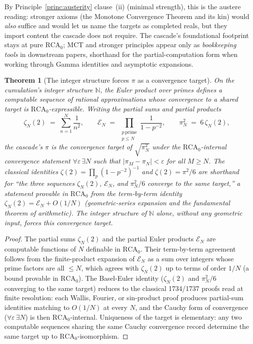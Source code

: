 \documentclass[11pt,a4paper]{article}
\newtheorem{theorem}{Theorem}[section]
\begin{document}
By Principle~\ref{princ:austerity} clause~(ii) (minimal strength),
this is the austere reading: stronger axioms (the Monotone
Convergence Theorem and its kin) would \emph{also} suffice and would
let us name the targets as completed reals, but they import content
the cascade does not require. The cascade's foundational footprint
stays at pure $\mathrm{RCA}_0$; $\mathrm{MCT}$ and stronger
principles appear only as \emph{bookkeeping tools} in downstream
papers, shorthand for the partial-computation form when working
through Gamma identities and asymptotic expansions.

\begin{theorem}[The integer structure forces $\pi$ as a convergence target]\label{thm:pi-from-primes}
On the cumulation's integer structure $\mathbb{N}$, the Euler product
over primes defines a computable sequence of rational approximations
whose convergence to a shared target is $\mathrm{RCA}_0$-expressible.
Writing the partial sums and partial products
\[
\zeta_N(2) \;=\; \sum_{n=1}^{N} \frac{1}{n^2},
\qquad
\mathcal{E}_N \;=\; \prod_{\substack{p\,\mathrm{prime}\\p\leq N}}
\frac{1}{1 - p^{-2}},
\qquad
\pi_N^2 \;=\; 6\,\zeta_N(2),
\]
the cascade's $\pi$ is the convergence target of $\sqrt{\pi_N^2}$
under the $\mathrm{RCA}_0$-internal convergence statement
$\forall\varepsilon\,\exists N$ such that $|\pi_M - \pi_N|<\varepsilon$
for all $M\geq N$. The classical identities
$\zeta(2) = \prod_p (1 - p^{-2})^{-1}$ and $\zeta(2)=\pi^2/6$ are
shorthand for ``the three sequences $\zeta_N(2)$, $\mathcal{E}_N$,
and $\pi_N^2/6$ converge to the same target,'' a statement provable
in $\mathrm{RCA}_0$ from the term-by-term identity
$\zeta_N(2) = \mathcal{E}_N + O(1/N)$ (geometric-series expansion and
the fundamental theorem of arithmetic). The integer structure of
$\mathbb{N}$ alone, without any geometric input, forces this
convergence target.
\end{theorem}

\begin{proof}
The partial sums $\zeta_N(2)$ and the partial Euler products
$\mathcal{E}_N$ are computable functions of $N$ definable in
$\mathrm{RCA}_0$. Their term-by-term agreement follows from the
finite-product expansion of $\mathcal{E}_N$ as a sum over integers
whose prime factors are all $\leq N$, which agrees with
$\zeta_N(2)$ up to terms of order $1/N$ (a bound provable in
$\mathrm{RCA}_0$). The Basel-Euler identity ($\zeta_N(2)$ and
$\pi_N^2/6$ converging to the same target) reduces to the classical
1734/1737 proofs read at finite resolution: each Wallis, Fourier,
or sin-product proof produces partial-sum identities matching to
$O(1/N)$ at every $N$, and the Cauchy form of convergence
($\forall\varepsilon\,\exists N$) is then $\mathrm{RCA}_0$-internal.
Uniqueness of the target is elementary: any two computable sequences
sharing the same Cauchy convergence record determine the same target
up to $\mathrm{RCA}_0$-isomorphism.
\end{proof}
\end{document}
